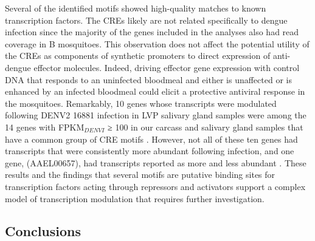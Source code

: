 Several of the identified motifs showed high-quality matches to known transcription factors.
The \glspl{CRE} likely are not related specifically to dengue infection since the majority of the genes included in the analyses also had read coverage in B mosquitoes.
This observation does not affect the potential utility of the \glspl{CRE} as components of synthetic promoters to direct expression of anti-dengue effector molecules.
Indeed, driving effector gene expression with control DNA that responds to an uninfected bloodmeal and either is unaffected or is enhanced by an infected bloodmeal could elicit a protective antiviral response in the mosquitoes.
Remarkably, 10 genes whose transcripts were modulated following \gls{DENV}2 16881 infection in LVP salivary gland samples were among the 14 genes with FPKM$_{DENVI}$ ≥ 100 in our carcass and salivary gland samples that have a common group of \gls{CRE} motifs \cite{Luplertlop2011}.
However, not all of these ten genes had transcripts that were consistently more abundant following infection, and one gene, (AAEL00657), had transcripts reported as more and less abundant \cite{Luplertlop2011}.
These results and the findings that several motifs are putative binding sites for transcription factors acting through repressors and activators support a complex model of transcription modulation that requires further investigation.

\subsection{Conclusions}

